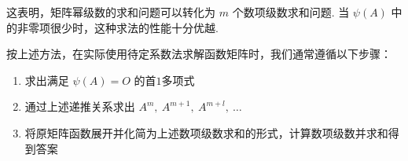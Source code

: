             \par 这表明，矩阵幂级数的求和问题可以转化为 $m$ 个数项级数求和问题. 当 $\psi(A)$ 中的非零项很少时，这种求法的性能十分优越.
            \\
            \par 按上述方法，在实际使用待定系数法求解函数矩阵时，我们通常遵循以下步骤：
            \begin{enumerate}
                \item 求出满足 $\psi(A) = O$ 的首$1$多项式
                \item 通过上述递推关系求出 $A^{m}, \ A^{m+1}, \ A^{m+l}, \ \dots$
                \item 将原矩阵函数展开并化简为上述数项级数求和的形式，计算数项级数并求和得到答案
            \end{enumerate}

